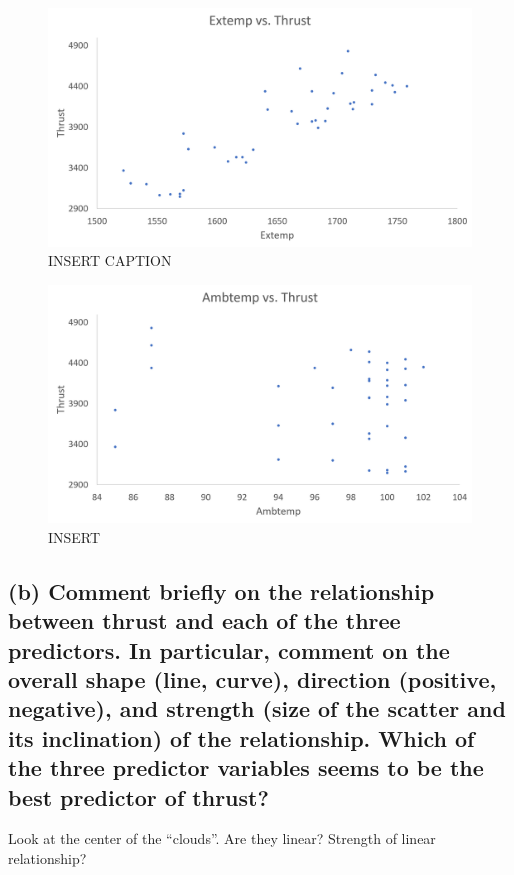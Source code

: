 \documentclass[letterpaper]{article}
\begin{document}
\begin{figure}[H]
 \centering
 \includegraphics[width=\textwidth]{extempthrust.png}
 \caption{INSERT CAPTION}
\end{figure}

\begin{figure}[H]
 \centering
 \includegraphics[width=\textwidth]{ambtempthrust.png}
 \caption{INSERT}
\end{figure}

\subsection{(b)	Comment briefly on the relationship between thrust and each of the three predictors. In particular, comment on the overall shape (line, curve), direction (positive, negative), and strength (size of the scatter and its inclination) of the relationship. Which of the three predictor variables seems to be the best predictor of thrust? }
\label{1b}
Look at the center of the “clouds”.  Are they linear? Strength of
linear relationship?
\end{document}
